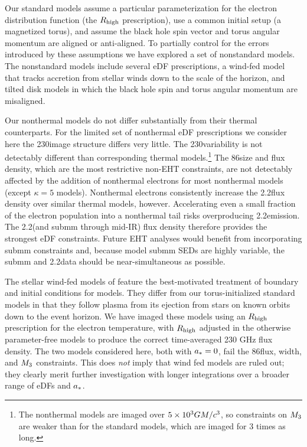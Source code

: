 Our standard models assume a particular parameterization for the electron distribution function (the $R_\mathrm{high}$ prescription), use a common initial setup (a magnetized torus), and assume the black hole spin vector and torus angular momentum are aligned or anti-aligned.  To partially control for the errors introduced by these assumptions we have explored a set of nonstandard models.  The nonstandard models include several eDF prescriptions, a wind-fed model that tracks accretion from stellar winds down to the scale of the horizon, and tilted disk models in which the black hole spin and torus angular momentum are misaligned.

Our nonthermal models do not differ substantially from their thermal counterparts.
For the limited set of nonthermal eDF prescriptions we consider here the 230\GHz image structure differs very little.
The 230\GHz variability is not detectably different than corresponding thermal models.\footnote{The nonthermal models are imaged over $5\times 10^3GM/c^3$, so constraints on $M_{3}$ are weaker than for the standard models, which are imaged for 3 times as long.}
The 86\GHz size and flux density, which are the most restrictive non-EHT constraints, are not detectably affected by the addition of nonthermal electrons for most nonthermal models (except $\kappa = 5$ models).
Nonthermal electrons consistently increase the 2.2\um flux density over similar thermal models, however.
Accelerating even a small fraction of the electron population into a nonthermal tail risks overproducing 2.2\um emission.
The 2.2\um (and submm through mid-IR) flux density therefore provides the strongest eDF constraints.
Future EHT analyses would benefit from incorporating submm constraints \citep[e.g.,][]{2019ApJ...881L...2B} and, because model submm SEDs are highly variable, the submm and 2.2\um data should be near-simultaneous as possible.

The stellar wind-fed models of \cite{2020ApJ...896L...6R} feature the best-motivated treatment of boundary and initial conditions for \sgra models.  They differ from our torus-initialized standard models in that they follow plasma from its ejection from stars on known orbits down to the event horizon.  We have imaged these models using an $R_\mathrm{high}$ prescription for the electron temperature, with $R_\mathrm{high}$ adjusted in the otherwise parameter-free models to produce the correct time-averaged 230 GHz flux density.  The two models considered here, both with $a_* = 0$, fail the 86\GHz flux, \mring width, and $M_{3}$ constraints.  This does {\em not} imply that wind fed models are ruled out; they clearly merit further investigation with longer integrations over a broader range of eDFs and $a_*$.


